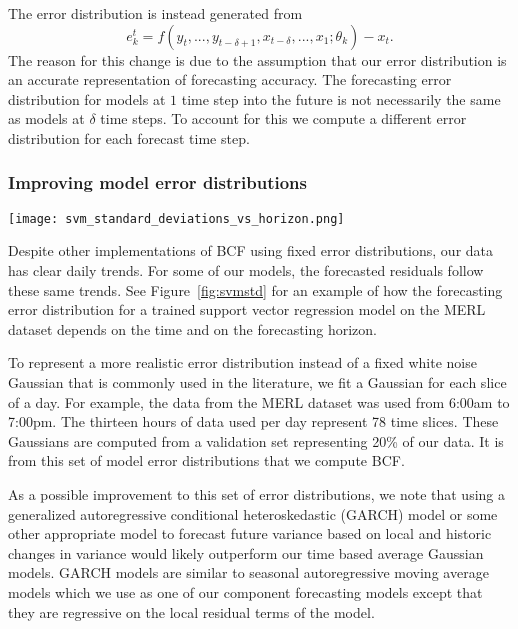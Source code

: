 The error distribution is instead generated from 
\begin{equation}
e^{t}_{k} = f(y_{t}, ..., y_{t - \delta + 1}, x_{t - \delta}, ..., x_{1};\theta_{k}) - x_{t}.
\end{equation}
The reason for this change is due to the assumption that our error distribution is an accurate representation of forecasting accuracy.  
The forecasting error distribution for models at $1$ time step into the future is not necessarily the same as models at $\delta$ time steps.  To account for this we compute a different error distribution for each forecast time step.


\subsubsection{Improving model error distributions}

\begin{figure*}[t]
\centering
\texttt{[image: svm\_standard\_deviations\_vs\_horizon.png]}
\caption{Standard deviation of support vector machine residuals for all Wednesdays in MERL dataset.  Time index represents 10 minute intervals from 6:00am to 7:00pm.}
\label{fig:svmstd}
\end{figure*}

Despite other implementations of BCF using fixed error distributions, our data has clear daily trends.  For some of our models, the forecasted residuals follow these same trends.  See Figure~\ref{fig:svmstd} for an example of how the forecasting error distribution for a trained support vector regression model on the MERL dataset depends on the time and on the forecasting horizon.

To represent a more realistic error distribution instead of a fixed white noise Gaussian that is commonly used in the literature, we fit a Gaussian for each slice of a day.  For example, the data from the MERL dataset was used from 6:00am to 7:00pm. The thirteen hours of data used per day represent 78 time slices.  These Gaussians are computed from a validation set representing 20\% of our data.  It is from this set of model error distributions that we compute BCF.

As a possible improvement to this set of error distributions, we note that using a generalized autoregressive conditional heteroskedastic (GARCH) model \cite{Box2008} or some other appropriate model to forecast future variance based on local and historic changes in variance would likely outperform our time based average Gaussian models.  GARCH models are similar to seasonal autoregressive moving average models which we use as one of our component forecasting models except that they are regressive on the local residual terms of the model.


